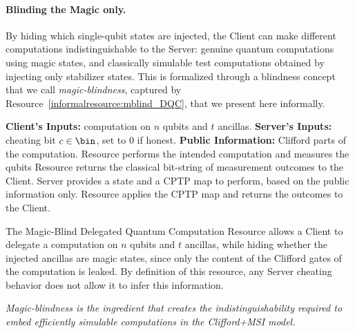 \paragraph{Blinding the Magic only.}
By hiding which single-qubit states are injected, the Client can make different computations indistinguishable to the Server: genuine quantum computations using magic states, and classically simulable test computations obtained by injecting only stabilizer states. This is formalized through a blindness concept that we call \emph{magic-blindness}, captured by Resource~\ref{informalresource:mblind_DQC}, that we present here informally.
\begin{informalresource}
    \caption{Magic-Blind DQC}
    \label{informalresource:mblind_DQC}
    \begin{algorithmic}[0]
        \State \textbf{Client's Inputs:} computation on $n$ qubits and $t$ ancillas.
        \State \textbf{Server's Inputs:} cheating bit $c\in\bin$, set to $0$ if honest.
        \State \textbf{Public Information:} Clifford parts of the computation.
        \State Resource performs the intended computation and measures the qubits
        \State Resource returns the classical bit-string of measurement outcomes to the Client.
        \State Server provides a state and a CPTP map to perform, based on the public information only.
        \State Resource applies the CPTP map and returns the outcomes to the Client.
        \EndIf
        \EndProcedure
    \end{algorithmic}
\end{informalresource}
The Magic-Blind Delegated Quantum Computation Resource allows a Client to delegate a computation on $n$ qubits and $t$ ancillas, while hiding whether the injected ancillas are magic states, since only the content of the Clifford gates of the computation is leaked. By definition of this resource, any Server cheating behavior does not allow it to infer this information.
\begin{center}
    \textit{
        Magic-blindness is the ingredient that creates the indistinguishability required to embed efficiently simulable computations in the Clifford+MSI model.
    }
\end{center}

